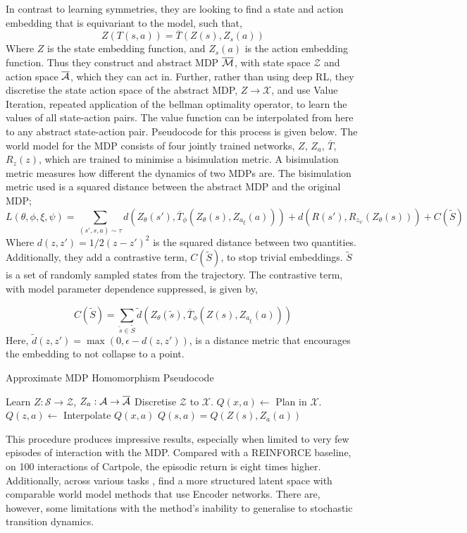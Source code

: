 In contrast to learning symmetries, they are looking to find a state and action embedding that is equivariant to the model, such that,
\begin{equation}
	Z(T(s, a)) = \overline{T}(Z(s), Z_s(a))
\end{equation}
Where $Z$ is the state embedding function, and $Z_s(a)$ is the action embedding function. Thus they construct and abstract MDP $\overline{\mathcal{M}}$, with state space $\mathcal{Z}$ and action space $\overline{\mathcal{A}}$, which they can act in. Further, rather than using deep RL, they discretise the state action space of the abstract MDP, $Z \rightarrow \mathcal{X}$, and use Value Iteration, repeated application of the bellman optimality operator, to learn the values of all state-action pairs. The value function can be interpolated from here to any abstract state-action pair. Pseudocode for this process is given below. The world model for the MDP consists of four jointly trained networks, $Z$, $Z_a$, $\overline{T}$,$R_z(z)$, which are trained to minimise a bisimulation metric. A bisimulation metric measures how different the dynamics of two MDPs are. The bisimulation metric used is a squared distance between the abstract MDP and the original MDP;
\begin{equation}
	L(\theta, \phi, \xi, \psi) = \sum_{(s', s, a) \sim \tau} d(Z_\theta (s'), \overline{T}_\phi(Z_\theta(s), Z_{a_\xi}(a))) +  d(R(s'), R_{z_\psi}(Z_\theta (s))) + C(\tilde{S})
\end{equation}
Where $d(z, z') = 1/2 (z - z')^2$ is the squared distance between two quantities. Additionally, they add a contrastive term, $C(\tilde{S})$, to stop trivial embeddings. $\tilde{S}$ is a set of randomly sampled states from the trajectory. The contrastive term, with model parameter dependence suppressed, is given by,

\begin{equation}
	C(\tilde{S}) = \sum_{\tilde{s} \in \tilde{S}} \tilde{d}(Z_\theta(\tilde{s}), \overline{T}_\phi(Z(s), Z_{a_\xi}(a)))
\end{equation}
Here, $\tilde{d}(z, z') = \max(0, \epsilon - d(z, z'))$, is a distance metric that encourages the embedding to not collapse to a point.
\begin{algorithm}
	\caption{Approximate MDP Homomorphism Pseudocode}
	\begin{algorithmic}
		\State Learn $Z: \mathcal{S} \rightarrow \mathcal{Z}$, $Z_a: \mathcal{A} \rightarrow \overline{\mathcal{A}}$
		\State Discretise $\mathcal{Z}$ to $\mathcal{X}$.
		\State $Q(x, a) \leftarrow $ Plan in $\mathcal{X}$.
		\State $Q(z, a) \leftarrow$ Interpolate $Q(x, a)$
		\State $Q(s, a) = Q(Z(s), Z_a(a))$
	\end{algorithmic}
\end{algorithm}
This procedure produces impressive results, especially when limited to very few episodes of interaction with the MDP. Compared with a REINFORCE baseline, on 100 interactions of Cartpole, the episodic return is eight times higher. Additionally, across various tasks \cite{van2020plannable}, find a more structured latent space with comparable world model methods that use Encoder networks. There are, however, some limitations with the method's inability to generalise to stochastic transition dynamics.

